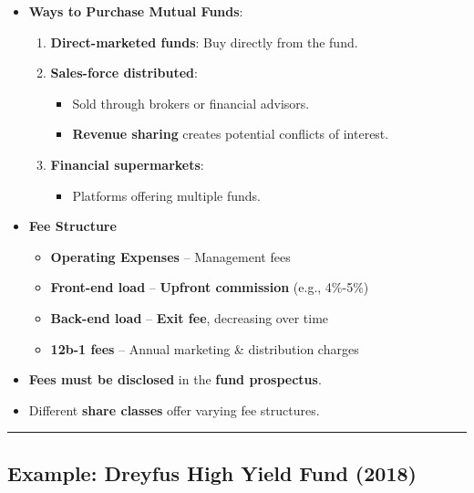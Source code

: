 \documentclass[
  letterpaper,
  DIV=11,
  numbers=noendperiod]{scrartcl}
\providecommand{\tightlist}{%
  \setlength{\itemsep}{0pt}\setlength{\parskip}{0pt}}\usepackage{longtable,booktabs,array}
\begin{document}
\begin{itemize}
\item
  \textbf{Ways to Purchase Mutual Funds}:

  \begin{enumerate}
  \def\labelenumi{\arabic{enumi}.}
  \item
    \textbf{Direct-marketed funds}: Buy directly from the fund.
  \item
    \textbf{Sales-force distributed}:

    \begin{itemize}
    \tightlist
    \item
      Sold through brokers or financial advisors.
    \item
      \textbf{Revenue sharing} creates potential conflicts of interest.
    \end{itemize}
  \item
    \textbf{Financial supermarkets}:

    \begin{itemize}
    \tightlist
    \item
      Platforms offering multiple funds.
    \end{itemize}
  \end{enumerate}
\item
  \textbf{Fee Structure}

  \begin{itemize}
  \tightlist
  \item
    \textbf{Operating Expenses} -- Management fees
  \item
    \textbf{Front-end load} -- \textbf{Upfront commission} (e.g.,
    4\%-5\%)
  \item
    \textbf{Back-end load} -- \textbf{Exit fee}, decreasing over time
  \item
    \textbf{12b-1 fees} -- Annual marketing \& distribution charges
  \end{itemize}
\item
  \textbf{Fees must be disclosed} in the \textbf{fund prospectus}.
\item
  Different \textbf{share classes} offer varying fee structures.
\end{itemize}

\begin{center}\rule{0.5\linewidth}{0.5pt}\end{center}

\subsection{Example: Dreyfus High Yield Fund
(2018)}\label{example-dreyfus-high-yield-fund-2018}
\end{document}
